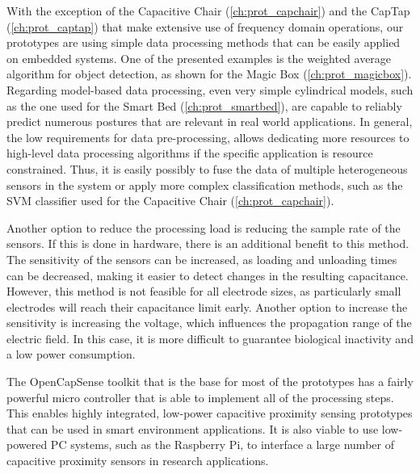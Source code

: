 With the exception of the Capacitive Chair (\ref{ch:prot_capchair}) and the CapTap (\ref{ch:prot_captap}) that make extensive use of frequency domain operations, our prototypes are using simple data processing methods that can be easily applied on embedded systems. One of the presented examples is the weighted average algorithm for object detection, as shown for the Magic Box (\ref{ch:prot_magicbox}). Regarding model-based data processing, even very simple cylindrical models, such as the one used for the Smart Bed (\ref{ch:prot_smartbed}), are capable to reliably predict numerous postures that are relevant in real world applications. In general, the low requirements for data pre-processing, allows dedicating more resources to high-level data processing algorithms if the specific application is resource constrained. Thus, it is easily possibly to fuse the data of multiple heterogeneous sensors in the system or apply more complex classification methods, such as the SVM classifier used for the Capacitive Chair (\ref{ch:prot_capchair}).

Another option to reduce the processing load is reducing the sample rate of the sensors. If this is done in hardware, there is an additional benefit to this method. The sensitivity of the sensors can be increased, as loading and unloading times can be decreased, making it easier to detect changes in the resulting capacitance. However, this method is not feasible for all electrode sizes, as particularly small electrodes will reach their capacitance limit early. Another option to increase the sensitivity is increasing the voltage, which influences the propagation range of the electric field. In this case, it is more difficult to guarantee biological inactivity and a low power consumption.

The OpenCapSense toolkit that is the base for most of the prototypes has a fairly powerful micro controller that is able to implement all of the processing steps. This enables highly integrated, low-power capacitive proximity sensing prototypes that can be used in smart environment applications. It is also viable to use low-powered PC systems, such as the Raspberry Pi, to interface a large number of capacitive proximity sensors in research applications.
